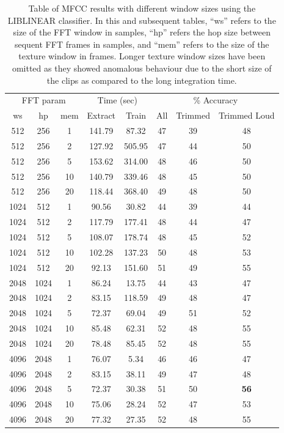 \begin{table}
\begin{tabular}{|c|c|c|c|c|c|c|c|}
\hline
\multicolumn{3}{|c|}{FFT param} & \multicolumn{2}{c|}{Time (sec)} & \multicolumn{3}{c|}{\% Accuracy} \\
\hhline{|-|-|-|-|-|-|-|-|}
ws & hp & mem & Extract & Train & All & Trimmed & Trimmed Loud \\
\hhline{|=|=|=|=|=|=|=|=|}
512  & 256  & 1    &    141.79  &    87.32  &  47  & 39 & 48 \\
512  & 256  & 2    &    127.92  &   505.95  &  47  & 44 & 50 \\
512  & 256  & 5    &    153.62  &   314.00  &  48  & 46 & 50 \\
512  & 256  & 10   &    140.79  &   339.46  &  48  & 45 & 50 \\
512  & 256  & 20   &    118.44  &   368.40  &  49  & 48 & 50 \\
\hline
1024 & 512  & 1    &     90.56  &    30.82  &  44  & 39 & 44 \\
1024 & 512  & 2    &    117.79  &   177.41  &  48  & 44 & 47 \\
1024 & 512  & 5    &    108.07  &   178.74  &  48  & 45 & 52 \\
1024 & 512  & 10   &    102.28  &   137.23  &  50  & 48 & 53 \\
1024 & 512  & 20   &     92.13  &   151.60  &  51  & 49 & 55 \\
\hline
2048 & 1024 & 1    &     86.24  &    13.75  &  44  & 43 & 47 \\
2048 & 1024 & 2    &     83.15  &   118.59  &  49  & 48 & 47 \\
2048 & 1024 & 5    &     72.37  &    69.04  &  49  & 51 & 52 \\
2048 & 1024 & 10   &     85.48  &    62.31  &  52  & 48 & 55 \\
2048 & 1024 & 20   &     78.48  &    85.45  &  52  & 48 & 55 \\
\hline
4096 & 2048 & 1    &     76.07  &     5.34  &  46  & 46 & 47 \\
4096 & 2048 & 2    &     83.15  &    38.11  &  49  & 47 & 48 \\
4096 & 2048 & 5    &     72.37  &    30.38  &  51  & 50 & \textbf{56} \\
4096 & 2048 & 10   &     75.06  &    28.24  &  52  & 47 & 53\\
4096 & 2048 & 20   &     77.32  &    27.35  &  52  & 48 & 55 \\
\hline
\end{tabular}
\caption{Table of MFCC results with different window
  sizes using the LIBLINEAR classifier.  In this and subsequent
  tables, ``ws'' refers to the size of the FFT window in samples,
  ``hp'' refers the hop size between sequent FFT frames in samples,
  and ``mem'' refers to the size of the texture window in frames.
  Longer texture window sizes have been omitted as they showed
  anomalous behaviour due to the short size of the clips as compared
  to the long integration time.}
\label{table:calls-fft}
\end{table}

